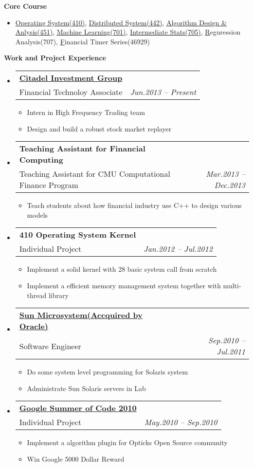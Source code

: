 \documentclass[letterpaper,11pt]{article}
\makeatletter
\newcommand{\resitem}[1]{\item #1 \vspace{-2pt}}
\newcommand{\resheading}[1]{{\large \colorbox{mygrey}{\begin{minipage}{\textwidth}{\textbf{#1 \vphantom{p\^{E}}}}\end{minipage}}}}
\newcommand{\ressubheading}[4]{
\begin{tabular*}{6.5in}{l@{\extracolsep{\fill}}r}
		\textbf{#1} & #2 \\
		{#3}{} & \textit{#4} \\
\end{tabular*}\vspace{-6pt}}
\makeatother
\begin{document}
\resheading{{Core Course}}
  \begin{itemize}
		\item{\small \href{http://www.cs.cmu.edu/~410/}{Operating System(410)}, 
    \href{http://www.cs.cmu.edu/~dga/15-440/F12/}{Distributed System(442)}, 
    \href{http://www.cs.cmu.edu/~./15451/}{Algorithm Design \& Anlysis(451)}, 
    \href{http://www.cs.cmu.edu/~epxing/Class/10701/}{Machine Learning(701)}, 
    \href{http://www.stat.cmu.edu/~larry/=stat705/}{Intermediate Stats(705)},
    \href{}Reguression Analysis(707),
    \href{}Financial Timer Series(46929)}
	\end{itemize}
\resheading{Work and Project Experience}
	\begin{itemize}
    \item
      \ressubheading{\href{http://www.citadel.com}{Citadel Investment Group}}{}{Financial Technoloy Associate}{Jun.2013 -- Present}
      { \footnotesize
				\begin{itemize}
					\resitem{Intern in High Frequency Trading team}
          \resitem{Design and build a robust stock market replayer}
				\end{itemize}
			}
    \item 
			\ressubheading{Teaching Assistant for Financial Computing}{}{Teaching Assistant for CMU Computational Finance Program}{Mar.2013 -- Dec.2013}
            { \footnotesize
				\begin{itemize}
          \resitem{Teach students about how financial industry use C++ to design various models}
				\end{itemize}
			}
    \item 
			\ressubheading{410 Operating System Kernel}{}{Individual Project}{Jan.2012 -- Jul.2012}
            { \footnotesize
				\begin{itemize}
          \resitem{Implement a solid kernel with 28 basic system call from scratch}
					\resitem{Implement a efficient memory management system together with multi-thread library}
				\end{itemize}
			}
		\item 
			\ressubheading{\href{http://www.oracle.com/us/sun/index.html}
      {Sun Microsystem(Accquired by Oracle)}}{}
      {Software Engineer}
      {Sep.2010 -- Jul.2011}
      { \footnotesize
				\begin{itemize}
					\resitem{Do some system level programming for Solaris system}
					\resitem{Administrate Sun Solaris servers in Lab}
				\end{itemize}
			}

		\item 
      \ressubheading{\href{http://code.google.com/soc/}{Google Summer of Code 2010}}{}{Individual Project}{May.2010 -- Sep.2010}
				{ \footnotesize
				\begin{itemize}
					\resitem{Implement a algorithm plugin for Opticks Open Source community}
                    \resitem{Win Google 5000 Dollar Reward}
				\end{itemize}
				}
	\end{itemize}
\end{document}
